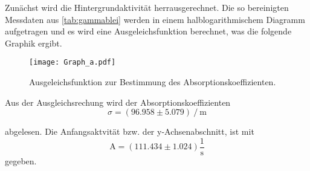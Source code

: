 Zunächst wird die Hintergrundaktivität herrausgerechnet.
Die so bereinigten Messdaten aus \autoref{tab:gammablei} werden in einem halblogarithmischem Diagramm aufgetragen und es wird eine Ausgeleichsfunktion berechnet, was die folgende Graphik ergibt.

\begin{figure}[H]
    \centering
    \texttt{[image: Graph\_a.pdf]}
    \caption{Ausgeleichsfunktion zur Bestimmung des Absorptionskoeffizienten.}
    \label{fig:plot1}
  \end{figure}

Aus der Ausgleichsrechung wird der Absorptionskoeffizienten 
\begin{equation*}
    \sigma =  \left( 96.958 \pm 5.079 \right) \mathbin{/} \unit{\meter}
\end{equation*}

abgelesen. Die Anfangsaktvität bzw. der y-Achsenabschnitt, ist mit 
\begin{equation*}
    \text{A} =  \left( 111.434 \pm 1.024 \right)  \dfrac{1}{\unit{\second}}
\end{equation*}
gegeben.